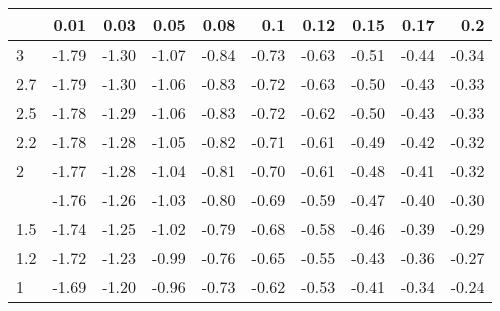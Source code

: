 
\begin{tabular}{lrrrrrrrrr}
\toprule
  & 0.01 & 0.03 & 0.05 & 0.08 & 0.1 & 0.12 & 0.15 & 0.17 & 0.2\\
\midrule
3 & -1.79 & -1.30 & -1.07 & -0.84 & -0.73 & -0.63 & -0.51 & -0.44 & -0.34\\
2.7 & -1.79 & -1.30 & -1.06 & -0.83 & -0.72 & -0.63 & -0.50 & -0.43 & -0.33\\
2.5 & -1.78 & -1.29 & -1.06 & -0.83 & -0.72 & -0.62 & -0.50 & -0.43 & -0.33\\
2.2 & -1.78 & -1.28 & -1.05 & -0.82 & -0.71 & -0.61 & -0.49 & -0.42 & -0.32\\
2 & -1.77 & -1.28 & -1.04 & -0.81 & -0.70 & -0.61 & -0.48 & -0.41 & -0.32\\
\addlinespace
1.7 & -1.76 & -1.26 & -1.03 & -0.80 & -0.69 & -0.59 & -0.47 & -0.40 & -0.30\\
1.5 & -1.74 & -1.25 & -1.02 & -0.79 & -0.68 & -0.58 & -0.46 & -0.39 & -0.29\\
1.2 & -1.72 & -1.23 & -0.99 & -0.76 & -0.65 & -0.55 & -0.43 & -0.36 & -0.27\\
1 & -1.69 & -1.20 & -0.96 & -0.73 & -0.62 & -0.53 & -0.41 & -0.34 & -0.24\\
\bottomrule
\end{tabular}
